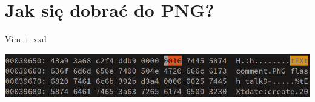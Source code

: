 \documentclass[]{beamer}
\begin{document}
\section[Jak się dobrać do PNG?]{Jak się dobrać do PNG?}
\begin{frame}{Vim + xxd}
  \begin{center}
    \includegraphics[width=\textwidth]{../img/vim.png}
  \end{center}
\end{frame}
\end{document}
